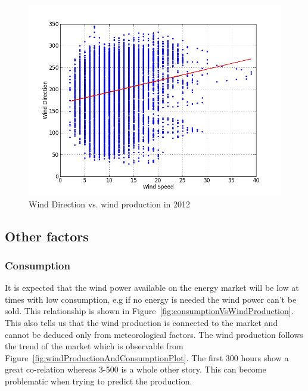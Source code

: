 \begin{figure}[H]
\centering
\includegraphics[width=0.99\linewidth,natwidth=898,natheight=587]{billeder/windDirectionVersusWindSpeed.png}
\caption{Wind Direction vs. wind production in 2012}
\label{fig:windDirectionVersusWindSpeed}
\end{figure}

\subsection{Other factors}

\subsubsection{Consumption}
\label{sec:consumptionWindProduction}
It is expected that the wind power available on the energy market will be low at times with low consumption, e.g if no energy is needed the wind power can't be sold.  This relationship is shown in Figure~\ref{fig:consumptionVsWindProduction}. This also tells us that the wind production is connected to the market and cannot be deduced only from meteorological factors. The wind production follows the trend of the market which is observable from Figure~\ref{fig:windProductionAndConsumptionPlot}. The first 300 hours show a great co-relation whereas 3-500 is a whole other story. This can become problematic when trying to predict the production.

